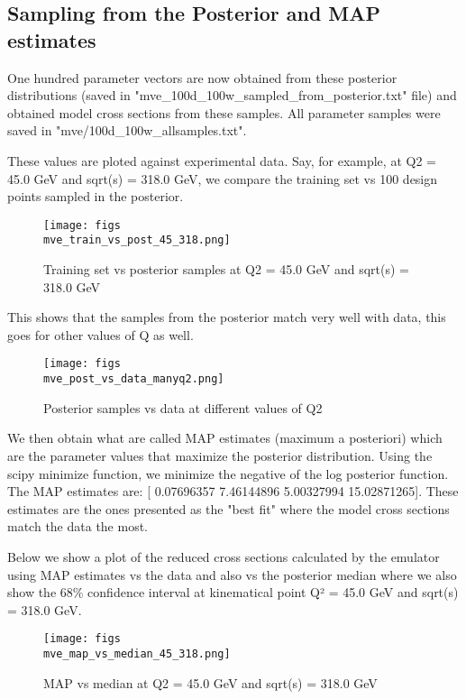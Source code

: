 \documentclass{article}
\begin{document}
\subsection{Sampling from the Posterior and MAP estimates}

One hundred parameter vectors are now obtained from these posterior distributions (saved in "mve_100d_100w_sampled_from_posterior.txt" file) and obtained model cross sections from these samples. All parameter samples were saved in "mve/100d_100w_allsamples.txt".

These values are ploted against experimental data. Say, for example, at Q2 = 45.0 GeV and sqrt(s) = 318.0 GeV, we compare the training set vs 100 design points sampled in the posterior.

\begin{figure}
\centering
\texttt{[image: figs\\mve\_train\_vs\_post\_45\_318.png]}
\caption{Training set vs posterior samples at Q2 = 45.0 GeV and sqrt(s) = 318.0 GeV}
\label{fig:mve_train_vs_post_45_318}
\end{figure}

This shows that the samples from the posterior match very well with data, this goes for other values of Q as well.

\begin{figure}
\centering
\texttt{[image: figs\\mve\_post\_vs\_data\_manyq2.png]}
\caption{Posterior samples vs data at different values of Q2}
\label{fig:mve_post_vs_data_manyq2}
\end{figure}

We then obtain what are called MAP estimates (maximum a posteriori) which are the parameter values that maximize the posterior distribution. Using the scipy minimize function, we minimize the negative of the log posterior function. The MAP estimates are: [ 0.07696357  7.46144896  5.00327994 15.02871265]. These estimates are the ones presented as the "best fit" where the model cross sections match the data the most.

Below we show a plot of the reduced cross sections calculated by the emulator using MAP estimates vs the data and also vs the posterior median where we also show the 68\% confidence interval at kinematical point Q² = 45.0 GeV and sqrt(s) = 318.0 GeV.

\begin{figure}
\centering
\texttt{[image: figs\\mve\_map\_vs\_median\_45\_318.png]}
\caption{MAP vs median at Q2 = 45.0 GeV and sqrt(s) = 318.0 GeV}
\label{fig:mve_map_vs_median_45_318}
\end{figure}
\end{document}
